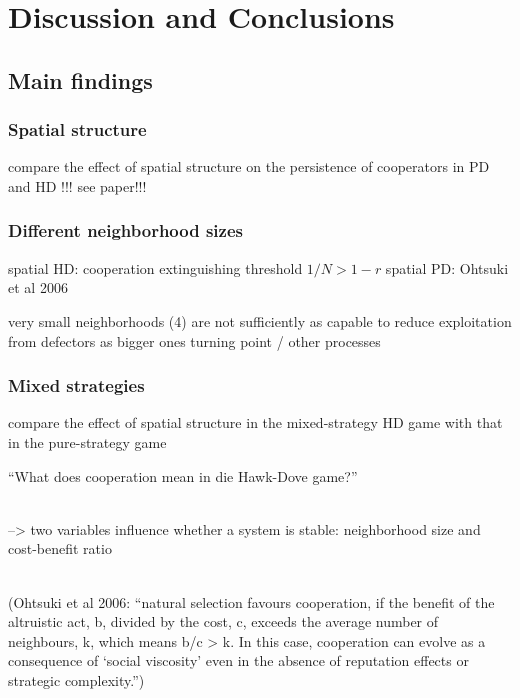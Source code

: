 \section{Discussion and Conclusions}

\subsection{Main findings}

\subsubsection*{Spatial structure}

compare the effect of spatial structure on the persistence of cooperators in PD and HD !!! see paper!!!

\subsubsection*{Different neighborhood sizes}


spatial HD: cooperation extinguishing threshold $1 / N > 1 - r$
spatial PD: Ohtsuki et al 2006

very small neighborhoods (4) are not sufficiently as capable to reduce exploitation from defectors as bigger ones
turning point / other processes

\subsubsection*{Mixed strategies}

compare the effect of spatial structure in the mixed-strategy HD game with that in the pure-strategy game





``What does cooperation mean in die Hawk-Dove game?''

\\
--> two variables influence whether a system is stable: neighborhood size and cost-benefit ratio

\\
(Ohtsuki et al 2006:
 ``natural selection favours cooperation, if the
 benefit of the altruistic act, b, divided by the cost, c, exceeds the
 average number of neighbours, k, which means b/c > k. In this
 case, cooperation can evolve as a consequence of ‘social viscosity’
 even in the absence of reputation effects or strategic complexity.'')
 


